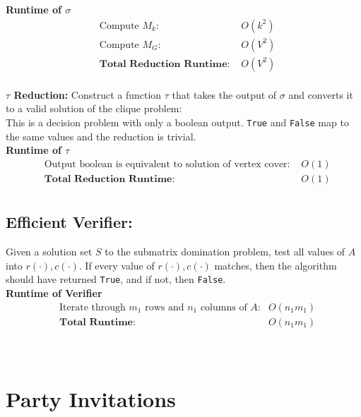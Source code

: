 \documentclass[11pt]{article}
\begin{document}
\textbf{Runtime of $\sigma$}
\begin{align*}
&\text{Compute $M_k$: } &O(k^2)\\ 
&\text{Compute $M_G$: } &O(V^2)\\ 
&\textbf{Total Reduction Runtime: } &O(V^2)\\
\end{align*}


\textbf{$\tau$ Reduction:}
Construct a function $\tau$ that takes the output of $\sigma$ and converts it to a valid solution of the clique problem:\\

This is a decision problem with only a boolean output. \texttt{True} and \texttt{False} map to the same values and the reduction is trivial.\\

\textbf{Runtime of $\tau$ }
\begin{align*}
&\text{Output boolean is equivalent to solution of vertex cover: } &O(1)\\ 
&\textbf{Total Reduction Runtime: } &O(1)\\
\end{align*}


\subsection{Efficient Verifier:}
Given a solution set $S$ to the submatrix domination problem, test all values of $A$ into $r(\cdot),c(\cdot)$. If every value of $r(\cdot),c(\cdot)$ matches, then the algorithm should have returned \texttt{True}, and if not, then \texttt{False}. \\

\textbf{Runtime of Verifier }
\begin{align*}
&\text{Iterate through $m_1$ rows and $n_1$ columns of $A$:} &O(n_1m_1)\\
&\textbf{Total Runtime: } &O(n_1m_1)\\
\end{align*}

\begin{center}
\quad{}\quad{}\\
\end{center}

\section{Party Invitations}
\end{document}
